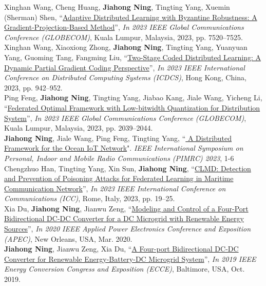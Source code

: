 \documentclass{resume}
\begin{document}
Xinghan Wang, Cheng Huang, \textbf{Jiahong Ning}, Tingting Yang, Xuemin (Sherman) Shen, “\href{https://dblp.org/rec/conf/globecom/WangHNYS23}{Adaptive Distributed Learning with Byzantine Robustness: A Gradient-Projection-Based Method}”, \emph{In 2023 IEEE Global Communications Conference (GLOBECOM)}, Kuala Lumpur, Malaysia, 2023, pp. 7520--7525.\\

Xinghan Wang, Xiaoxiong Zhong, \textbf{Jiahong Ning}, Tingting Yang, Yuanyuan Yang, Guoming Tang, Fangming Liu, “\href{https://dblp.org/rec/conf/icdcs/WangZNYYTL23}{Two-Stage Coded Distributed Learning: A Dynamic Partial Gradient Coding Perspective}”, \emph{In 2023 IEEE International Conference on Distributed Computing Systems (ICDCS)}, Hong Kong, China, 2023, pp. 942--952.\\

Ping Feng, \textbf{Jiahong Ning}, Tingting Yang, Jiabao Kang, Jiale Wang, Yicheng Li, “\href{https://doi.org/10.1109/GLOBECOM54140.2023.10437303}{Federated Optimal Framework with Low-bitwidth Quantization for Distribution System}”, \emph{In 2023 IEEE Global Communications Conference (GLOBECOM)}, Kuala Lumpur, Malaysia, 2023, pp. 2039--2044.\\

\textbf{Jiahong Ning}, Jiale Wang, Ping Feng, Tingting Yang, “\href{https://ieeexplore.ieee.org/abstract/document/10294049}{
A Distributed Framework for the Ocean IoT Network}". \emph{IEEE International Symposium on Personal, Indoor and Mobile Radio Communications (PIMRC) 2023}, 1-6\\

Chengzhuo Han, Tingting Yang, Xin Sun, \textbf{Jiahong Ning}, ``\href{https://doi.org/10.1109/ICC45041.2023.10279179}{CLMD: Detection and Prevention of Poisoning Attacks for Federated Learning in Maritime Communication Network}'', \emph{In 2023 IEEE International Conference on Communications (ICC)}, Rome, Italy, 2023, pp. 19--25.\\

Xia Du, \textbf{Jiahong Ning}, Jianwu Zeng, “\href{https://doi.org/10.1109/APEC39645.2020.9124276}{Modeling and Control of a Four-Port Bidirectional DC-DC Converter for a DC Microgrid with Renewable Energy Sources}”, \emph{In 2020 IEEE Applied Power Electronics Conference and Exposition (APEC)}, New Orleans, USA, Mar. 2020.\\

\textbf{Jiahong Ning}, Jianwu Zeng, Xia Du, “\href{https://doi.org/10.1109/ECCE.2019.8912185}{A Four-port Bidirectional DC-DC Converter for Renewable Energy-Battery-DC Microgrid System}”, \emph{In 2019 IEEE Energy Conversion Congress and Exposition (ECCE)}, Baltimore, USA, Oct. 2019.\\
\end{document}

